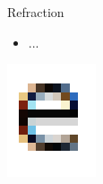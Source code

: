 \documentclass{lug}
\newcommand{\splitslide}[4]{
    \noindent
    \begin{minipage}{#1 \textwidth - #2 }
        #3
    \end{minipage}%
    \hspace{ \dimexpr #2 * 2 \relax }%
    \begin{minipage}{\textwidth - #1 \textwidth - #2 }
        #4
    \end{minipage}
}
\begin{document}
\begin{frame}{Refraction}
    \splitslide{0.65}{.7em}{
        \small
        \begin{itemize}
            \item ...
        \end{itemize}
    }{
        \includegraphics[width=\textwidth]{graphics/subpixel_e}
    }
\end{frame}
\end{document}
